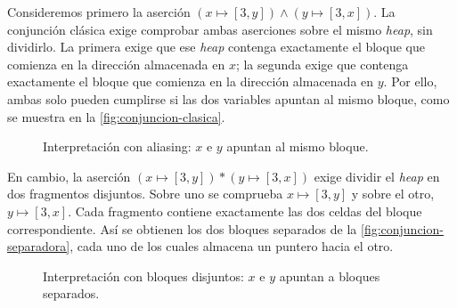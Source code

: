 \documentclass[a4paper,	11pt]{report}
\begin{document}
Consideremos primero la aserción $(x \mapsto [3, y]) \land (y \mapsto [3, x])$.
La conjunción clásica exige comprobar ambas aserciones sobre el mismo \emph{heap},
sin dividirlo.
La primera exige que ese \emph{heap} contenga exactamente el bloque que comienza en la dirección almacenada en $x$;
la segunda exige que contenga exactamente el bloque que comienza en la dirección almacenada en $y$.
Por ello,
ambas solo pueden cumplirse si las dos variables apuntan al mismo bloque,
como se muestra en la \autoref{fig:conjuncion-clasica}.

\begin{figure}[h]
  \centering
\caption{Interpretación con aliasing: $x$ e $y$ apuntan al mismo bloque.}
\label{fig:conjuncion-clasica}
\end{figure}

En cambio,
la aserción $(x \mapsto [3, y]) * (y \mapsto [3, x])$ exige dividir el \emph{heap} en dos fragmentos disjuntos.
Sobre uno se comprueba $x \mapsto [3, y]$ y sobre el otro, $y \mapsto [3, x]$.
Cada fragmento contiene exactamente las dos celdas del bloque correspondiente.
Así se obtienen los dos bloques separados de la \autoref{fig:conjuncion-separadora},
cada uno de los cuales almacena un puntero hacia el otro.

\begin{figure}[h]
  \centering
\caption{Interpretación con bloques disjuntos: $x$ e $y$ apuntan a bloques separados.}
\label{fig:conjuncion-separadora}
\end{figure}
\end{document}
